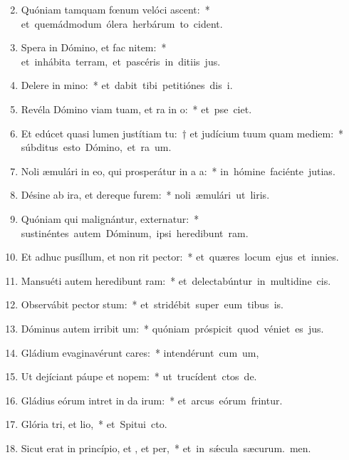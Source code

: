 \begin{flushleft}
\begin{enumerate}[leftmargin=*]
\setcounter{enumi}{1}

\item Quóniam tamquam fœnum velóci ascent:~* \mbox{et quemádmodum ólera herbárum to cident.}
\item Spera in Dómino, et fac nitem:~* \mbox{et inhábita terram, et pascéris in ditiis jus.}
\item Delere in mino:~* \mbox{et dabit tibi petitiónes dis i.}
\item Revéla Dómino viam tuam, et ra in o:~* \mbox{et pse ciet.}
\item Et edúcet quasi lumen justítiam tu:~† et judícium tuum quam mediem:~* \mbox{súbditus esto Dómino, et ra um.}
\item Noli æmulári in eo, qui prosperátur in a a:~* \mbox{in hómine faciénte jutias.}
\item Désine ab ira, et dereque furem:~* \mbox{noli æmulári ut liris.}
\item Quóniam qui malignántur, externatur:~* \mbox{sustinéntes autem Dóminum, ipsi heredibunt ram.}
\item Et adhuc pusíllum, et non rit pector:~* \mbox{et quæres locum ejus et  innies.}
\item Mansuéti autem heredibunt ram:~* \mbox{et delectabúntur in multidine cis.}
\item Observábit pector stum:~* \mbox{et stridébit super eum tibus is.}
\item Dóminus autem irribit um:~* \mbox{quóniam próspicit quod véniet es jus.}
\item Gládium evaginavérunt cares:~* \mbox{intendérunt cum um,}
\item Ut dejíciant páupe et nopem:~* \mbox{ut trucídent ctos de.}
\item Gládius eórum intret in da irum:~* \mbox{et arcus eórum frintur.}
\item Glória tri, et lio,~* \mbox{et Spitui cto.}
\item Sicut erat in princípio, et , et per,~* \mbox{et in s\'{\ae}cula sæcurum. men.}

\end{enumerate}
\end{flushleft}

